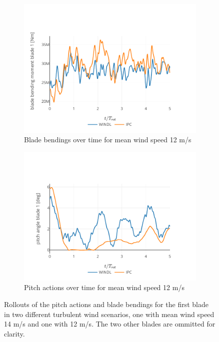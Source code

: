 \begin{figure}[hbt]
  \begin{subfigure}[b]{0.48\textwidth}
      \centering
      \includegraphics[width=\textwidth]{images/adjusted_lowwind_blade_rollout.pdf}
      \caption{Blade bendings over time for mean wind speed 12 m/s}
      \label{fig:adjusted-rollout-lowwind-blade}
  \end{subfigure}
  \begin{subfigure}[b]{0.48\textwidth}
    \centering
    \includegraphics[width=\textwidth]{images/adjusted_lowwind_pitch_rollout.pdf}
    \caption{Pitch actions over time for mean wind speed 12 m/s}
    \label{fig:adjusted-rollout-lowwind-pitch}
  \end{subfigure}
  \caption{Rollouts of the pitch actions and blade bendings for the first blade in two different turbulent wind scenarios, one with mean wind speed 14 m/s and one with 12 m/s. The two other blades are ommitted for clarity.}
  \label{fig:adjusted-rollout}
\end{figure}

